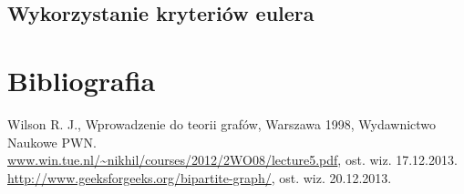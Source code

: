\documentclass[a4 122pt]{article}
\begin{document}
	\subsection{Wykorzystanie kryteriów eulera}

\section{Bibliografia}

		Wilson R. J., Wprowadzenie do teorii grafów, Warszawa 1998, Wydawnictwo Naukowe PWN.\\[0.3cm]
		\url{www.win.tue.nl/~nikhil/courses/2012/2WO08/lecture5.pdf}, ost. wiz. 17.12.2013.\\[0.3cm]
		\url{http://www.geeksforgeeks.org/bipartite-graph/}, ost. wiz. 20.12.2013.
\end{document}
